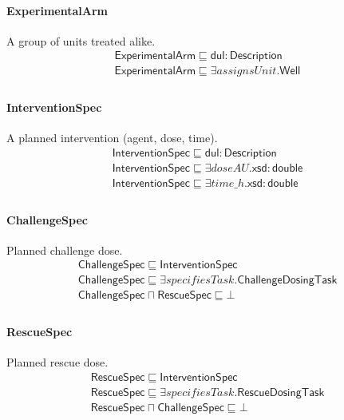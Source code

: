 \documentclass[10pt]{article}
\begin{document}
\paragraph{ExperimentalArm} A group of units treated alike.
\[\begin{array}{l}
\mathsf{ExperimentalArm} \sqsubseteq  \mathsf{dul{:}Description} \\
\mathsf{ExperimentalArm} \sqsubseteq  \exists \mathit{assignsUnit}.\mathsf{Well} \\
\end{array}\]
\paragraph{InterventionSpec} A planned intervention (agent, dose, time).
\[\begin{array}{l}
\mathsf{InterventionSpec} \sqsubseteq  \mathsf{dul{:}Description} \\
\mathsf{InterventionSpec} \sqsubseteq  \exists \mathit{doseAU}.\mathsf{xsd{:}double} \\
\mathsf{InterventionSpec} \sqsubseteq  \exists \mathit{time\_h}.\mathsf{xsd{:}double} \\
\end{array}\]
\paragraph{ChallengeSpec} Planned challenge dose.
\[\begin{array}{l}
\mathsf{ChallengeSpec} \sqsubseteq  \mathsf{InterventionSpec} \\
\mathsf{ChallengeSpec} \sqsubseteq  \exists \mathit{specifiesTask}.\mathsf{ChallengeDosingTask} \\
\mathsf{ChallengeSpec} \sqcap  \mathsf{RescueSpec} \sqsubseteq  \bot  \\
\end{array}\]
\paragraph{RescueSpec} Planned rescue dose.
\[\begin{array}{l}
\mathsf{RescueSpec} \sqsubseteq  \mathsf{InterventionSpec} \\
\mathsf{RescueSpec} \sqsubseteq  \exists \mathit{specifiesTask}.\mathsf{RescueDosingTask} \\
\mathsf{RescueSpec} \sqcap  \mathsf{ChallengeSpec} \sqsubseteq  \bot  \\
\end{array}\]
\end{document}
